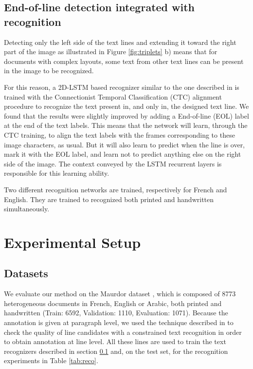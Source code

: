 \documentclass[conference]{IEEEtran}
\begin{document}
\subsection{End-of-line detection integrated with recognition}
\label{sec:recognizer}
Detecting only the left side of the text lines and extending it toward the right part of the image as illustrated in Figure \ref{fig:triplets} b) means that for documents with complex layouts, some text from other text lines can be present in the image to be recognized.

For this reason, a 2D-LSTM based recognizer similar to the one described in \cite{pham2014dropout} is trained with the Connectionist Temporal Classification \cite{Graves06connectionisttemporal} (CTC) alignment procedure to recognize the text present in, and only in, the designed text line. We found that the results were slightly improved by adding a End-of-line (EOL) label at the end of the text labels.
This  means that the network will learn, through the CTC training, to align the text labels with the frames corresponding to these image characters, as usual. But it will also learn to predict when the line is over, mark it with the EOL label, and learn  not to predict anything else on the right side of the image. The context conveyed by the LSTM recurrent layers is responsible for this learning ability.

Two different recognition networks are trained, respectively for French and English. They are trained to recognized both printed and handwritten simultaneously.

\section{Experimental Setup}
\label{sec:experimental}
\subsection{Datasets}
We evaluate our method on the Maurdor dataset \cite{Brunessaux2014}, which is composed of 8773 heterogeneous documents in French, English or Arabic, both printed and handwritten (Train: 6592, Validation: 1110, Evaluation: 1071). Because the annotation is given at paragraph level, we used the technique described in \cite{bluche2014automatic} to check the quality of line candidates with a constrained text recognition in order to obtain annotation at line level. All these lines are used to train the text recognizers described in section \ref{sec:recognizer} and, on the test set, for the recognition experiments in Table \ref{tab:reco}.
\end{document}
